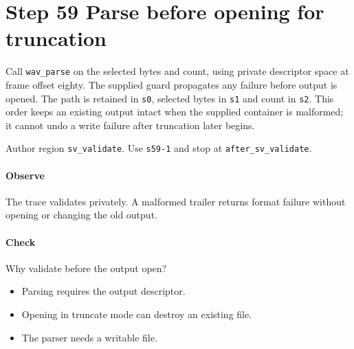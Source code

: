 \section{Step 59 Parse before opening for truncation}\label{pcm-wav-s59}
Call \texttt{wav\_parse} on the selected bytes and count, using private descriptor space at frame offset eighty. The supplied guard propagates any failure before output is opened. The path is retained in \texttt{s0}, selected bytes in \texttt{s1} and count in \texttt{s2}. This order keeps an existing output intact when the supplied container is malformed; it cannot undo a write failure after truncation later begins.

Author region \texttt{sv\_validate}. Use \texttt{s59-1} and stop at \texttt{after\_sv\_validate}.

\paragraph{Observe} The trace validates privately. A malformed trailer returns format failure without opening or changing the old output.

\paragraph{Check} Why validate before the output open?
\begin{itemize}
  \item[A.] Parsing requires the output descriptor.
  \item[B.] Opening in truncate mode can destroy an existing file.
  \item[C.] The parser needs a writable file.
\end{itemize}
